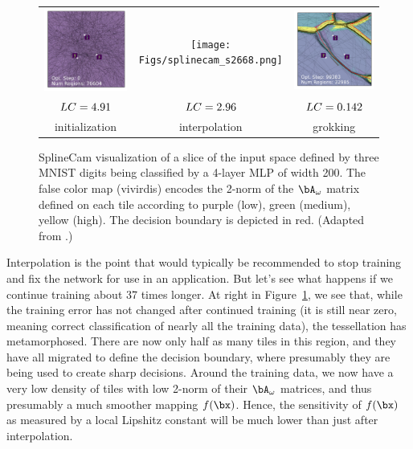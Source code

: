 \documentclass{notices}
\begin{document}
\begin{figure}
\centering
\setlength{\tabcolsep}{0pt}
\begin{tabular}{ccc}
\includegraphics[width=0.33\linewidth]{Figs/splinecam_s0.jpg}
& 
\texttt{[image: Figs/splinecam\_s2668.png]}
& 
\includegraphics[width=0.33\linewidth]{Figs/splinecam_s99383.png} 
\\[-1mm]
{\scriptsize ${\sl LC}=4.91$} & {\scriptsize ${\sl LC}=2.96$} & {\scriptsize ${\sl LC}=0.142$}
\\
{\small\sf initialization} & {\small\sf interpolation} & {\small\sf grokking}
\end{tabular}
    \vspace*{-3mm}
    \caption{\small
    SplineCam visualization of a slice of the input space defined by three MNIST digits being classified by a 4-layer MLP of width 200.
    The false color map (vivirdis) encodes the 2-norm of the $\bA_\omega$ matrix defined on each tile according to purple (low), green (medium), yellow (high). 
    The decision boundary is depicted in red. 
    (Adapted from \cite{alwaysgrok}.)
    }
    \label{fig:grok}
\end{figure}



Interpolation is the point that would typically be recommended to stop training and fix the network for use in an application.
But let's see what happens if we continue training about 37 times longer.
At right in Figure~\ref{fig:grok}, we see that, while the training error has not changed after continued training (it is still near zero, meaning correct classification of nearly all the training data), the tessellation has metamorphosed.
There are now only half as many tiles in this region, and they have all migrated to define the decision boundary, where presumably they are being used to create sharp decisions.
Around the training data, we now have a very low density of tiles with low 2-norm of their $\bA_\omega$ matrices, and thus presumably a much smoother mapping $f(\bx)$.
Hence, the sensitivity of $f(\bx)$ as measured by a local Lipshitz constant will be much lower than just after interpolation.
\end{document}
